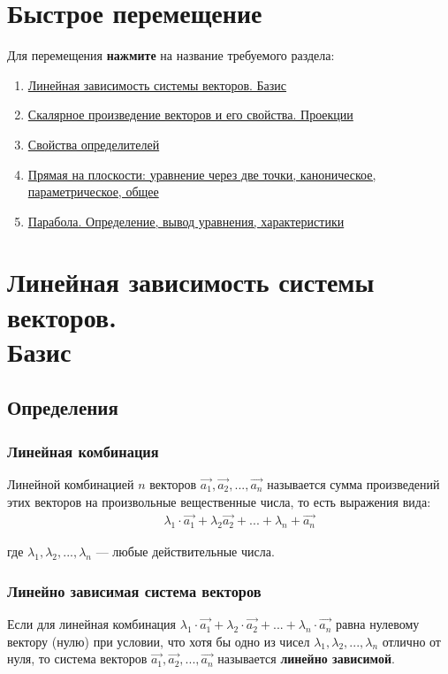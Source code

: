 \documentclass[12pt, fleqn]{extarticle}
\begin{document}
\section*{Быстрое перемещение}

Для перемещения \textbf{нажмите} на название требуемого раздела:
\begin{enumerate}[noitemsep]
    \item \hyperref[sec:linear-dependence]{Линейная зависимость системы векторов. Базис}
    \item \hyperref[sec:scalar-multiply]{Скалярное произведение векторов и его свойства. Проекции}
    \item \hyperref[sec:det]{Свойства определителей}
    \item \hyperref[sec:line]{Прямая на плоскости: уравнение через две точки, каноническое, параметрическое, общее}
    \item \hyperref[sec:parabola]{Парабола. Определение, вывод уравнения, характеристики}
\end{enumerate}

\newpage

\section{Линейная зависимость системы векторов. \\ Базис}\label{sec:linear-dependence}

\subsection*{Определения}

\subsubsection*{Линейная комбинация}
Линейной комбинацией \(n\) векторов \(\overrightarrow{a_1}, \overrightarrow{a_2}, ..., \overrightarrow{a_n}\) называется сумма произведений этих векторов на произвольные вещественные числа, то есть выражения вида:
\begin{align*}
     &  &
    \lambda_1 \cdot \overrightarrow{a_1} + \lambda_2 \overrightarrow{a_2} + ... + \lambda_n + \overrightarrow{a_n}
\end{align*}

где \(\lambda_1, \lambda_2, ..., \lambda_n\) — любые действительные числа.

\subsubsection*{Линейно зависимая система векторов}
Если для линейная комбинация \(\lambda_1 \cdot \overrightarrow{a_1} + \lambda_2 \cdot \overrightarrow{a_2} + ... + \lambda_n \cdot \overrightarrow{a_n}\) равна нулевому вектору (нулю) при условии, что хотя бы одно из чисел \(\lambda_1, \lambda_2, ..., \lambda_n\) отлично от нуля, то система векторов \(\overrightarrow{a_1}, \overrightarrow{a_2}, ..., \overrightarrow{a_n}\) называется \textbf{линейно зависимой}.
\end{document}

